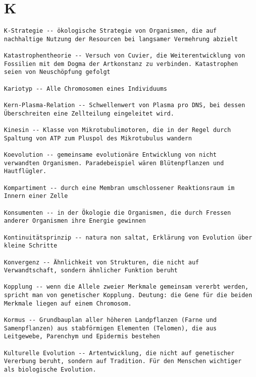 \documentclass{article}
\begin{document}
\section{K}
\begin{verbatim}
K-Strategie -- ökologische Strategie von Organismen, die auf nachhaltige Nutzung der Resourcen bei langsamer Vermehrung abzielt

Katastrophentheorie -- Versuch von Cuvier, die Weiterentwicklung von Fossilien mit dem Dogma der Artkonstanz zu verbinden. Katastrophen seien von Neuschöpfung gefolgt

Kariotyp -- Alle Chromosomen eines Individuums

Kern-Plasma-Relation -- Schwellenwert von Plasma pro DNS, bei dessen Überschreiten eine Zellteilung eingeleitet wird.

Kinesin -- Klasse von Mikrotubulimotoren, die in der Regel durch Spaltung von ATP zum Pluspol des Mikrotubulus wandern

Koevolution -- gemeinsame evolutionäre Entwicklung von nicht verwandten Organismen. Paradebeispiel wären Blütenpflanzen und Hautflügler.

Kompartiment -- durch eine Membran umschlossener Reaktionsraum im Innern einer Zelle

Konsumenten -- in der Ökologie die Organismen, die durch Fressen anderer Organismen ihre Energie gewinnen

Kontinuitätsprinzip -- natura non saltat, Erklärung von Evolution über kleine Schritte

Konvergenz -- Ähnlichkeit von Strukturen, die nicht auf Verwandtschaft, sondern ähnlicher Funktion beruht

Kopplung -- wenn die Allele zweier Merkmale gemeinsam vererbt werden, spricht man von genetischer Kopplung. Deutung: die Gene für die beiden Merkmale liegen auf einem Chromosom.

Kormus -- Grundbauplan aller höheren Landpflanzen (Farne und Samenpflanzen) aus stabförmigen Elementen (Telomen), die aus Leitgewebe, Parenchym und Epidermis bestehen

Kulturelle Evolution -- Artentwicklung, die nicht auf genetischer Vererbung beruht, sondern auf Tradition. Für den Menschen wichtiger als biologische Evolution.
\end{verbatim}
\newpage
\end{document}
